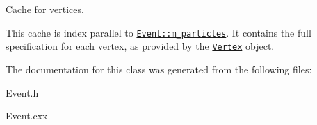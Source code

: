 Cache for vertices. 

This cache is index parallel to {\tt \hyperlink{classEvent_9d70f2f173bbb01fbd90e15860697a18}{Event::m\_\-particles}}. It contains the full specification for each vertex, as provided by the {\tt \hyperlink{classVertex}{Vertex}} object. 

The documentation for this class was generated from the following files:\begin{CompactItemize}
\item 
Event.h\item 
Event.cxx\end{CompactItemize}
